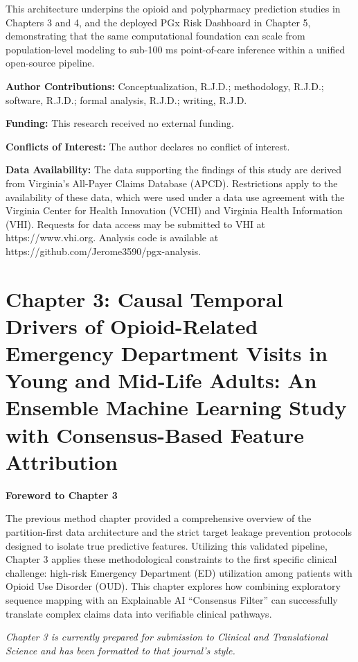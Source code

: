 \documentclass[
  12pt,
]{book}
\begin{document}
This architecture underpins the opioid and polypharmacy prediction
studies in Chapters 3 and 4, and the deployed PGx Risk Dashboard in
Chapter 5, demonstrating that the same computational foundation can
scale from population-level modeling to sub-100 ms point-of-care
inference within a unified open-source pipeline.

\textbf{Author Contributions:} Conceptualization, R.J.D.; methodology,
R.J.D.; software, R.J.D.; formal analysis, R.J.D.; writing, R.J.D.

\textbf{Funding:} This research received no external funding.

\textbf{Conflicts of Interest:} The author declares no conflict of
interest.

\textbf{Data Availability:} The data supporting the findings of this
study are derived from Virginia's All-Payer Claims Database (APCD).
Restrictions apply to the availability of these data, which were used
under a data use agreement with the Virginia Center for Health
Innovation (VCHI) and Virginia Health Information (VHI). Requests for
data access may be submitted to VHI at https://www.vhi.org. Analysis
code is available at https://github.com/Jerome3590/pgx-analysis.

\cleardoublepage

\chapter{Chapter 3: Causal Temporal Drivers of Opioid-Related Emergency
Department Visits in Young and Mid-Life Adults: An Ensemble Machine
Learning Study with Consensus-Based Feature Attribution}\label{chap-3}

\textbf{Foreword to Chapter 3}

The previous method chapter provided a comprehensive overview of the
partition-first data architecture and the strict target leakage
prevention protocols designed to isolate true predictive features.
Utilizing this validated pipeline, Chapter 3 applies these
methodological constraints to the first specific clinical challenge:
high-risk Emergency Department (ED) utilization among patients with
Opioid Use Disorder (OUD). This chapter explores how combining
exploratory sequence mapping with an Explainable AI ``Consensus Filter''
can successfully translate complex claims data into verifiable clinical
pathways.

\emph{Chapter 3 is currently prepared for submission to Clinical and
Translational Science and has been formatted to that journal's style.}
\end{document}
